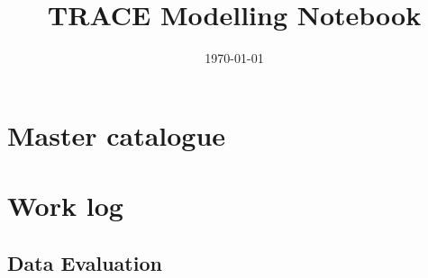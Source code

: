 \documentclass[a4paper, 11pt]{article}
\title{TRACE Modelling Notebook}
\author{}
\date{\today}
\begin{document}
\maketitle
\tableofcontents

\section{Master catalogue}

\section{Work log}


\subsection{Data Evaluation}


\end{document}
